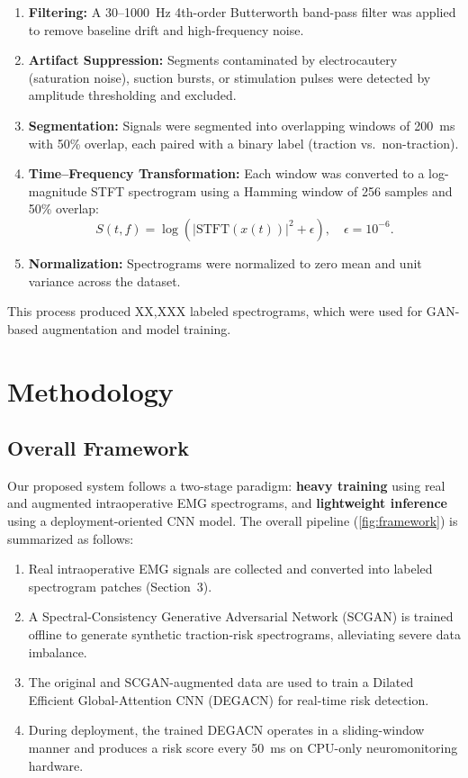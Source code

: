 \documentclass[10pt]{article}
\begin{document}
\begin{enumerate}
    \item \textbf{Filtering:} A 30–1000~Hz 4th-order Butterworth band-pass filter was applied to remove baseline drift and high-frequency noise.
    \item \textbf{Artifact Suppression:} Segments contaminated by electrocautery (saturation noise), suction bursts, or stimulation pulses were detected by amplitude thresholding and excluded.
    \item \textbf{Segmentation:} Signals were segmented into overlapping windows of \SI{200}{ms} with 50\% overlap, each paired with a binary label (traction vs.~non-traction).
    \item \textbf{Time–Frequency Transformation:} Each window was converted to a log-magnitude STFT spectrogram using a Hamming window of 256 samples and 50\% overlap:
    \[
    S(t,f) = \log\left(|\text{STFT}(x(t))|^2 + \epsilon\right), \quad \epsilon = 10^{-6}.
    \]
    \item \textbf{Normalization:} Spectrograms were normalized to zero mean and unit variance across the dataset.
\end{enumerate}

This process produced XX,XXX labeled spectrograms, which were used for GAN-based augmentation and model training.

\section{Methodology}

\subsection{Overall Framework}

Our proposed system follows a two-stage paradigm: \textbf{heavy training} using real and augmented intraoperative EMG spectrograms, and \textbf{lightweight inference} using a deployment-oriented CNN model. 
The overall pipeline (\cref{fig:framework}) is summarized as follows:

\begin{enumerate}
    \item Real intraoperative EMG signals are collected and converted into labeled spectrogram patches (Section~3).
    \item A Spectral-Consistency Generative Adversarial Network (SCGAN) is trained offline to generate synthetic traction-risk spectrograms, alleviating severe data imbalance.
    \item The original and SCGAN-augmented data are used to train a Dilated Efficient Global-Attention CNN (DEGACN) for real-time risk detection.
    \item During deployment, the trained DEGACN operates in a sliding-window manner and produces a risk score every \SI{50}{ms} on CPU-only neuromonitoring hardware.
\end{enumerate}
\end{document}
